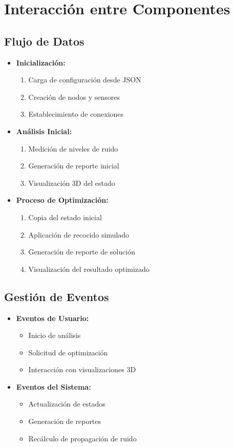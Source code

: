\documentclass[a4paper,12pt]{article}
\begin{document}
\section{Interacción entre Componentes}
\subsection{Flujo de Datos}
\begin{itemize}
    \item \textbf{Inicialización:}
    \begin{enumerate}
        \item Carga de configuración desde JSON
        \item Creación de nodos y sensores
        \item Establecimiento de conexiones
    \end{enumerate}
    
    \item \textbf{Análisis Inicial:}
    \begin{enumerate}
        \item Medición de niveles de ruido
        \item Generación de reporte inicial
        \item Visualización 3D del estado
    \end{enumerate}
    
    \item \textbf{Proceso de Optimización:}
    \begin{enumerate}
        \item Copia del estado inicial
        \item Aplicación de recocido simulado
        \item Generación de reporte de solución
        \item Visualización del resultado optimizado
    \end{enumerate}
\end{itemize}

\subsection{Gestión de Eventos}
\begin{itemize}
    \item \textbf{Eventos de Usuario:}
    \begin{itemize}
        \item Inicio de análisis
        \item Solicitud de optimización
        \item Interacción con visualizaciones 3D
    \end{itemize}
    
    \item \textbf{Eventos del Sistema:}
    \begin{itemize}
        \item Actualización de estados
        \item Generación de reportes
        \item Recálculo de propagación de ruido
    \end{itemize}
\end{itemize}
\end{document}
